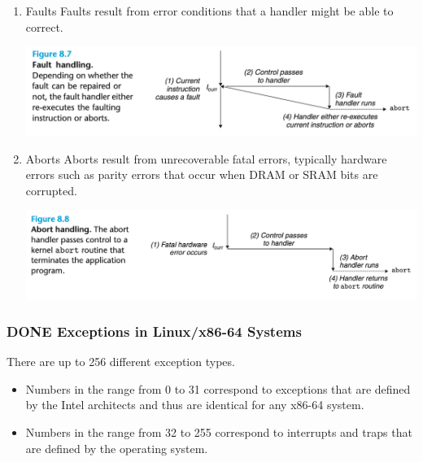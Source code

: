 \documentclass[11pt]{article}
\begin{document}
\begin{enumerate}
\item Faults
\label{sec:org5a6a21b}
Faults result from error conditions that a handler might be able to correct.\\

\begin{center}
\includegraphics[width=.9\linewidth]{pics/figure8.7-fault-handling.png}
\end{center}

\item Aborts
\label{sec:orgafc1ce4}
Aborts result from unrecoverable fatal errors, typically hardware errors such as parity errors that occur when DRAM or SRAM bits are corrupted.\\

\begin{center}
\includegraphics[width=.9\linewidth]{pics/figure8.8-abort-handling.png}
\end{center}
\end{enumerate}

\subsubsection{{\bfseries\sffamily DONE} Exceptions in Linux/x86-64 Systems}
\label{sec:org8fe25b4}
There are up to 256 different exception types.\\
\begin{itemize}
\item Numbers in the range from 0 to 31 correspond to exceptions that are defined by the Intel architects and thus are identical for any x86-64 system.\\
\item Numbers in the range from 32 to 255 correspond to interrupts and traps that are defined by the operating system.\\
\end{itemize}
\end{document}
